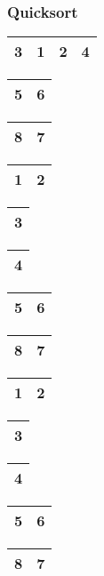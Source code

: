 
\begin{frame}
\frametitle{Quicksort}
\begin{table}
\begin{tabular}{| c | c | c | c |}
\hline
\cellcolor{red!25}3 & 1 & 2 & 4 \\ 
\hline
\end{tabular}
\quad
\begin{tabular}{| c | c |}
\hline
\cellcolor{blue!25}5 & \cellcolor{blue!25}6\\ 
\hline
\end{tabular}
\quad
\begin{tabular}{| c | c |}
\hline
8 & 7 \\ 
\hline
\end{tabular}
\end{table}

\begin{table}
\begin{tabular}{| c | c |}
\hline
1 & 2\\ 
\hline
\end{tabular}
\quad
\begin{tabular}{| c |}
\hline
\cellcolor{blue!25}3\\ 
\hline
\end{tabular}
\quad
\begin{tabular}{| c |}
\hline
4 \\ 
\hline
\end{tabular}
\quad
\begin{tabular}{| c | c |}
\hline
\cellcolor{blue!25}5 & \cellcolor{blue!25}6\\ 
\hline
\end{tabular}
\quad
\begin{tabular}{| c | c |}
\hline
8 & 7 \\ 
\hline
\end{tabular}
\end{table}

\begin{table}
\begin{tabular}{| c | c |}
\hline
\cellcolor{red!25}1 & 2\\ 
\hline
\end{tabular}
\quad
\begin{tabular}{| c |}
\hline
\cellcolor{blue!25}3\\ 
\hline
\end{tabular}
\quad
\begin{tabular}{| c |}
\hline
4 \\ 
\hline
\end{tabular}
\quad
\begin{tabular}{| c | c |}
\hline
\cellcolor{blue!25}5 & \cellcolor{blue!25}6\\ 
\hline
\end{tabular}
\quad
\begin{tabular}{| c | c |}
\hline
8 & 7 \\ 
\hline
\end{tabular}
\end{table}


\end{frame}

